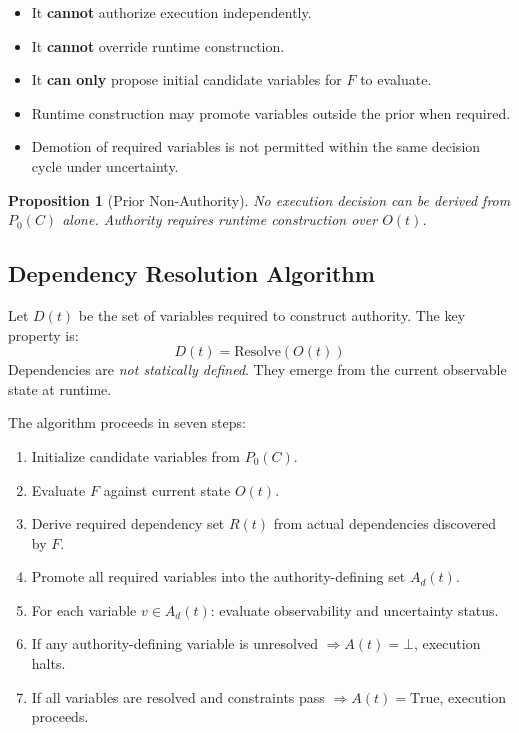 \documentclass[11pt]{article}
\newtheorem{proposition}{Proposition}
\begin{document}
\begin{itemize}
  \item It \textbf{cannot} authorize execution independently.
  \item It \textbf{cannot} override runtime construction.
  \item It \textbf{can only} propose initial candidate variables for $F$ to evaluate.
  \item Runtime construction may promote variables outside the prior when required.
  \item Demotion of required variables is not permitted within the same decision cycle
        under uncertainty.
\end{itemize}

\begin{proposition}[Prior Non-Authority]
No execution decision can be derived from $P_0(C)$ alone. Authority requires runtime
construction over $O(t)$.
\end{proposition}

\subsection{Dependency Resolution Algorithm}
\label{sec:dep-resolution}

Let $D(t)$ be the set of variables required to construct authority. The key property is:
\[
  D(t) = \mathrm{Resolve}(O(t))
\]
Dependencies are \emph{not statically defined}. They emerge from the current observable
state at runtime.

The algorithm proceeds in seven steps:

\begin{enumerate}
  \item Initialize candidate variables from $P_0(C)$.
  \item Evaluate $F$ against current state $O(t)$.
  \item Derive required dependency set $R(t)$ from actual dependencies discovered by $F$.
  \item Promote all required variables into the authority-defining set $A_d(t)$.
  \item For each variable $v \in A_d(t)$: evaluate observability and uncertainty status.
  \item If any authority-defining variable is unresolved $\Rightarrow A(t) = \bot$,
        execution halts.
  \item If all variables are resolved and constraints pass $\Rightarrow A(t) = \text{True}$,
        execution proceeds.
\end{enumerate}
\end{document}
